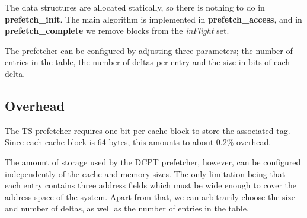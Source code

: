 The data structures are allocated statically, so there is nothing to do in
\textbf{prefetch\_init}. The main algorithm is implemented in
\textbf{prefetch\_access}, and in \textbf{prefetch\_complete} we remove blocks
from the \emph{inFlight} set.


The prefetcher can be configured by adjusting three parameters; the number of
entries in the table, the number of deltas per entry and the size in bits of
each delta.

\subsection{Overhead}

The TS prefetcher requires one bit per cache block to store the
associated tag. Since each cache block is 64 bytes, this amounts to about 0.2\%
overhead.

The amount of storage used by the DCPT prefetcher, however, can be configured
independently of the cache and memory sizes. The only limitation being that each
entry contains three address fields which must be wide enough to cover the
address space of the system. Apart from that, we can arbitrarily choose the size
and number of deltas, as well as the number of entries in the table.


